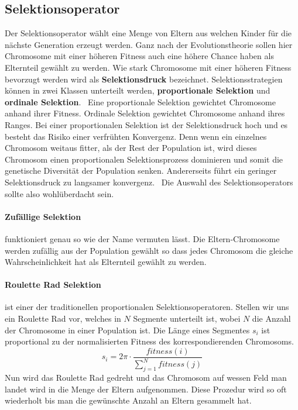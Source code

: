\subsection*{Selektionsoperator}
Der Selektionsoperator wählt eine Menge von Eltern aus welchen Kinder für die nächste Generation erzeugt werden. Ganz nach der Evolutionstheorie sollen hier Chromosome mit einer höheren Fitness auch eine höhere Chance haben als Elternteil gewählt zu werden. Wie stark Chromosome mit einer höheren Fitness bevorzugt werden wird als \textbf{Selektionsdruck} bezeichnet. Selektionsstrategien können in zwei Klassen unterteilt werden, \textbf{proportionale Selektion} und \textbf{ordinale Selektion}.~\cite*{TerminologiesAndOperators} Eine proportionale Selektion gewichtet Chromosome anhand ihrer Fitness. Ordinale Selektion gewichtet Chromosome anhand ihres Ranges. Bei einer proportionalen Selektion ist der Selektionsdruck hoch und es besteht das Risiko einer verfrühten Konvergenz. Denn wenn ein einzelnes Chromosom weitaus fitter, als der Rest der Population ist, wird dieses Chromosom einen proportionalen Selektionsprozess dominieren und somit die genetische Diversität der Population senken. Andererseits führt ein geringer Selektionsdruck zu langsamer konvergenz.~\cite{TerminologiesAndOperators} Die Auswahl des Selektionsoperators sollte also wohlüberdacht sein.

\paragraph*{Zufällige Selektion} funktioniert genau so wie der Name vermuten lässt. Die Eltern-Chromosome werden zufällig aus der Population gewählt so dass jedes Chromosom die gleiche Wahrscheinlichkeit hat als Elternteil gewählt zu werden.

\paragraph*{Roulette Rad Selektion} ist einer der traditionellen proportionalen Selektionsoperatoren. Stellen wir uns ein Roulette Rad vor, welches in $N$ Segmente unterteilt ist, wobei $N$ die Anzahl der Chromosome in einer Population ist. Die Länge eines Segmentes $s_i$ ist proportional zu der normalisierten Fitness des korrespondierenden Chromosoms.
\begin{equation}
    s_i = 2 \pi \cdot \frac{fitness(i)}{\sum_{j=1}^{N} fitness(j)}
\end{equation}
Nun wird das Roulette Rad gedreht und das Chromosom auf wessen Feld man landet wird in die Menge der Eltern aufgenommen. Diese Prozedur wird so oft wiederholt bis man die gewünschte Anzahl an Eltern gesammelt hat.

